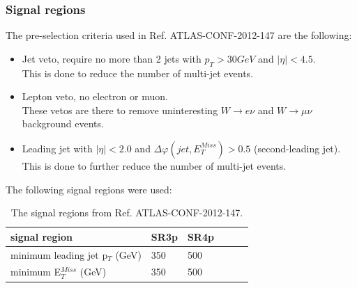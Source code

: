 \documentclass[handout]{beamer}
\begin{document}
\begin{frame}[shrink=20]\frametitle{Signal regions}
\begin{block}{}
The pre-selection criteria used in Ref. ATLAS-CONF-2012-147 are the following:
\begin{itemize}
\item Jet veto, require no more than 2 jets with $p_T > 30 GeV$ and $|\eta| < 4.5$.  \\ 
This is done to reduce the number of multi-jet events.
\item Lepton veto, no electron or muon. \\
These vetos are there to remove uninteresting $W \rightarrow e \nu$ and $W \rightarrow \mu \nu$ background events.
\item Leading jet with $|\eta| < 2.0$ and $\Delta \varphi (jet, E_T^{Miss})>0.5$ (second-leading jet).\\ 
This is done to further reduce the number of multi-jet events.
\end{itemize}
The following signal regions were used:
\end{block}
\begin{table}[h]
\renewcommand{\arraystretch}{1.2} %
\begin{center}
\begin{tabular}{l l l l l l}
\hline
signal region & SR3p & SR4p \\ \hline
minimum leading jet p$_T$ (GeV) & 350 & 500 \\
minimum E$^{Miss}_T$ (GeV) & 350 & 500 \\ \hline
\end{tabular}
\label{tab:oldsr}
\caption{The signal regions from Ref. ATLAS-CONF-2012-147.}
\end{center}
\renewcommand{\arraystretch}{1.0} %
\end{table}
\end{frame}
\end{document}
